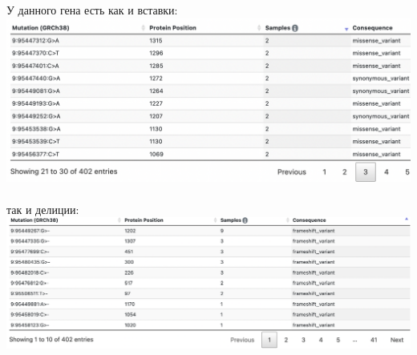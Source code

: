 \documentclass[12pt]{article}
\begin{document}
У данного гена есть как и вставки:\\
\includegraphics[width=\textwidth]{images/image3.png}\\\\
так и делиции:\\
\includegraphics[width=\textwidth]{images/image4.png}\\\\
\end{document}
